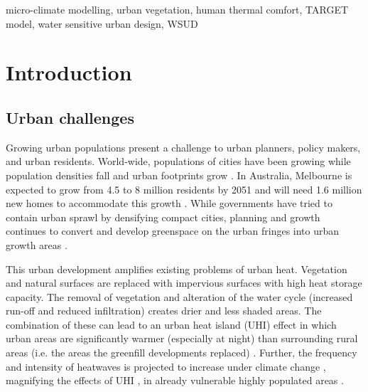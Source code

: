 \documentclass[final,3p,times,authoryear]{elsarticle}
\begin{document}
\begin{frontmatter}
\begin{abstract}
\end{abstract}

\begin{keyword}
micro-climate modelling, urban vegetation, human thermal comfort, TARGET model, water sensitive urban design, WSUD



\end{keyword}

\end{frontmatter}







\section{Introduction}\label{sec:introduction}
\subsection{Urban challenges}

Growing urban populations present a challenge to urban planners, policy makers, and urban residents. World-wide, populations of cities have been growing while population densities fall and urban footprints grow \citep{Roberts2007}. In Australia, Melbourne is expected to grow from 4.5 to 8 million residents by 2051 and will need 1.6 million new homes to accommodate this growth \citep{VictoriaStateGovernment2017}. While governments have tried to contain urban sprawl by densifying compact cities, planning and growth continues to convert and develop greenspace on the urban fringes into urban growth areas \citep{GrowthAreasAuthority2009}.

This urban development amplifies existing problems of urban heat. Vegetation and natural surfaces are replaced with impervious surfaces with high heat storage capacity. The removal of vegetation and alteration of the water cycle (increased run-off and reduced infiltration) creates drier and less shaded areas. The combination of these can lead to an urban heat island (UHI) effect in which urban areas are significantly warmer (especially at night) than surrounding rural areas (i.e. the areas the greenfill developments replaced) \citep{Coutts2010,Oke1982}. Further, the frequency and intensity of heatwaves is projected to increase under climate change \citep{Alexander2009}, magnifying the effects of UHI \citep{Rogers2018}, in already vulnerable highly populated areas \citep{Lemonsu2015}.
\end{document}
